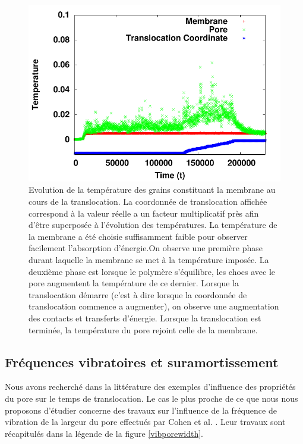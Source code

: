 \begin{figure}[H]
\begin{center}
\includegraphics[width=\textwidth]{temptransloc.pdf} 

\caption[Absorption d'énergie par la membrane]{Evolution de la température des grains constituant la membrane au cours de la translocation. La coordonnée de translocation affichée correspond à la valeur réelle a un facteur multiplicatif près afin d'être superposée à l'évolution des températures. La température de la membrane a été choisie suffisamment faible pour observer facilement l'absorption d'énergie.On observe une première phase durant laquelle la membrane se met à la température imposée. La deuxième phase est lorsque le polymère s'équilibre, les chocs avec le pore augmentent la température de ce dernier. Lorsque la translocation démarre (c'est à dire lorsque la coordonnée de translocation commence a augmenter), on observe une augmentation des contacts et transferts d'énergie. Lorsque la translocation est terminée, la température du pore rejoint celle de la membrane.}
\label{temptransloc}
\end{center}
\end{figure}


\newpage
\subsection{Fréquences vibratoires et suramortissement}

Nous avons recherché dans la littérature des exemples d'influence des propriétés du pore sur le temps de translocation. Le cas le plus proche de ce que nous nous proposons d'étudier concerne des travaux sur l'influence de la fréquence de vibration de la largeur du pore effectués par Cohen et al. \cite{Cohen2011}. Leur travaux sont récapitulés dans la légende de la figure \ref{vibporewidth}.



